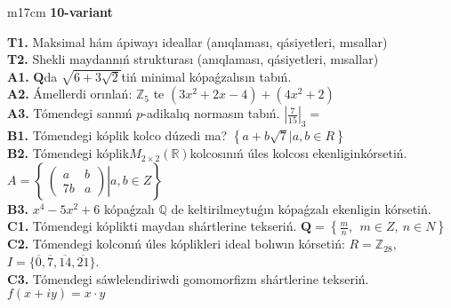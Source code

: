 \documentclass{article}
\begin{document}
\begin{tabular}{m{17cm}}
\textbf{10-variant}
\newline

\textbf{T1.} Maksimal hám ápiwayı ideallar (anıqlaması, qásiyetleri, mısallar) \\
\textbf{T2.} Shekli maydannıń strukturası (anıqlaması, qásiyetleri, mısallar) \\
\textbf{A1.} \(\mathbf{Q}\)da \(\sqrt{6 + 3\sqrt{2}}\)tiń minimal kópaǵzalısın tabıń. \\
\textbf{A2.} Ámellerdi orınlań: \(\mathbb{Z}_{5}\) te \(\left( 3x^{2} + 2x - 4 \right) + \left( 4x^{2} + 2 \right)\) \\
\textbf{A3.} Tómendegi sannıń \(p\)-adikalıq normasın tabıń. \(|\frac{7}{15}|_{3} =\) \\
\textbf{B1.} Tómendegi kóplik kolco dúzedi ma? \(\left\{ a + b\sqrt{7}|a,b \in R \right\}\) \\
\textbf{B2.} Tómendegi kóplik\(M_{2 \times 2}\left( \mathbb{R} \right)\)kolcosınıń úles kolcosı ekenliginkórsetiń. \(A = \left\{ \left. \ \begin{pmatrix}
a & b \\
7b & a
\end{pmatrix} \right|a,b \in Z \right\}\) \\
\textbf{B3.} \(x^{4} - 5x^{2} + 6\) kópaǵzalı \(\mathbb{Q}\) de keltirilmeytuǵın kópaǵzalı ekenligin kórsetiń. \\
\textbf{C1.} Tómendegi kóplikti maydan shártlerine tekseriń. \(\mathbf{Q} = \left\{ \frac{m}{n},\ \ m \in Z,\ n \in N \right\}\) \\
\textbf{C2.} Tómendegi kolconıń úles kóplikleri ideal bolıwın kórsetiń:
\(R = \mathbb{Z}_{28}\), \(I = \{\overline{0},\overline{7},\overline{14},\overline{21}\}\). \\
\textbf{C3.} Tómendegi sáwlelendiriwdi gomomorfizm shártlerine tekseriń. \(f(x + iy) = x \cdot y\) \\

\end{tabular}
\vspace{1cm}
\end{document}
